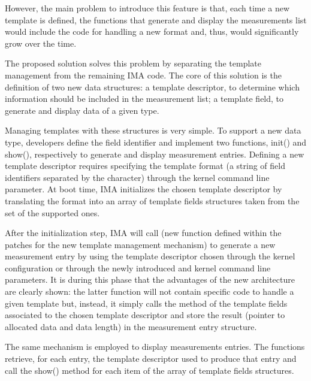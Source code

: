\documentclass[a4paper,8pt,english]{sphinxmanual}
\begin{document}
However, the main problem to introduce this feature is that, each time
a new template is defined, the functions that generate and display
the measurements list would include the code for handling a new format
and, thus, would significantly grow over the time.

The proposed solution solves this problem by separating the template
management from the remaining IMA code. The core of this solution is the
definition of two new data structures: a template descriptor, to determine
which information should be included in the measurement list; a template
field, to generate and display data of a given type.

Managing templates with these structures is very simple. To support
a new data type, developers define the field identifier and implement
two functions, init() and show(), respectively to generate and display
measurement entries. Defining a new template descriptor requires
specifying the template format (a string of field identifiers separated
by the \code{\textbar{}} character) through the  kernel command line
parameter. At boot time, IMA initializes the chosen template descriptor
by translating the format into an array of template fields structures taken
from the set of the supported ones.

After the initialization step, IMA will call 
(new function defined within the patches for the new template management
mechanism) to generate a new measurement entry by using the template
descriptor chosen through the kernel configuration or through the newly
introduced  and  kernel command line parameters.
It is during this phase that the advantages of the new architecture are
clearly shown: the latter function will not contain specific code to handle
a given template but, instead, it simply calls the  method of the template
fields associated to the chosen template descriptor and store the result
(pointer to allocated data and data length) in the measurement entry structure.

The same mechanism is employed to display measurements entries.
The functions  retrieve, for each entry,
the template descriptor used to produce that entry and call the show()
method for each item of the array of template fields structures.
\end{document}
